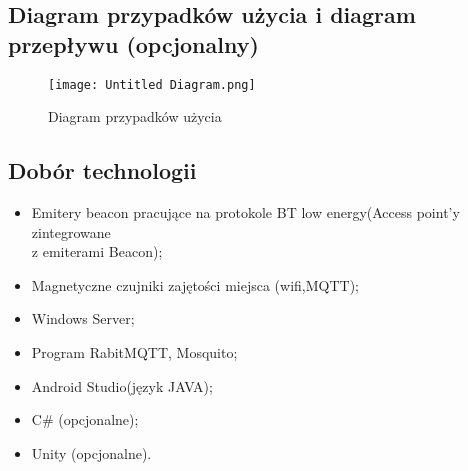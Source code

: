 \documentclass[12pt,a4paper]{article}
\begin{document}
\subsection{Diagram przypadków użycia i diagram przepływu (opcjonalny)}
\begin{figure}[htb!p]
\texttt{[image: Untitled Diagram.png]}
\caption{Diagram przypadków użycia}
\end{figure}

\subsection{Dobór technologii}
\begin{itemize}
\item Emitery beacon pracujące na protokole BT low energy(Access point’y zintegrowane \\z emiterami Beacon);
\item Magnetyczne czujniki zajętości miejsca (wifi,MQTT);
\item Windows Server;
\item Program RabitMQTT, Mosquito;
\item Android Studio(język JAVA);
\item C\# (opcjonalne);
\item Unity (opcjonalne).
\end{itemize}













\end{document}
